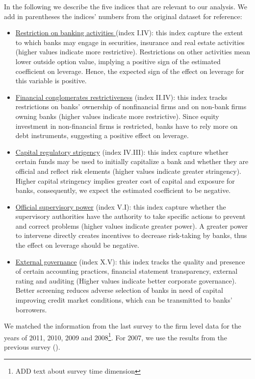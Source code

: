 \documentclass[12pt]{article}
\begin{document}
     In the following we describe the five indices that are relevant to our analysis. We add in parentheses the indices' numbers from the original dataset for reference:
      \begin{itemize}
     	\item \underline{Restriction on banking activities } (index I.IV): this index capture the extent to which banks may engage in securities, insurance and real estate activities (higher values indicate more restrictive). Restrictions on other activities mean lower outside option value, implying a positive sign of the estimated coefficient on leverage. Hence, the expected sign of the effect on leverage for this variable is positive.  
     	\item \underline{Financial conglomerates restrictiveness} (index II.IV): this index tracks restrictions on banks' ownership of nonfinancial firms and on non-bank firms owning banks (higher values indicate more restrictive). Since equity investment in non-financial firms is restricted, banks have to rely more on debt instruments, suggesting a positive effect on leverage. 
     	\item  \underline{Capital regulatory strigency} (index IV.III): this index capture whether certain funds may be used to initially capitalize a bank and whether they are official and reflect risk elements (higher values indicate greater stringency). Higher capital stringency implies greater cost of capital and exposure for banks, consequently, we expect the estimated coefficient to be negative.
     	\item \underline{Official supervisory power} (index V.I): this index capture whether the supervisory authorities have the authority to take specific actions to prevent and correct problems (higher values indicate greater power). A greater power to intervene directly creates incentives to decrease risk-taking by banks, thus the effect on leverage should be negative.
     	\item \underline{External governance} (index X.V): this index tracks the quality and presence of certain accounting practices, financial statement transparency, external rating and auditing  (Higher values indicate better corporate governance). Better screening reduces adverse selection of banks in need of capital improving credit market conditions, which can be transmitted to banks' borrowers.
     \end{itemize} 
	  
	  We matched the information from the last survey to the firm level data for the years of 2011, 2010, 2009 and 2008\footnote{ADD text about survey time dimension}. For 2007, we use the results from the previous survey (\cite{barth2008bank}).  
	   
\end{document}
